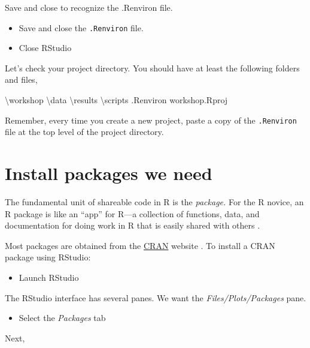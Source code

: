 \documentclass[
]{book}
\newenvironment{Shaded}{\begin{snugshade}}{\end{snugshade}}
\newcommand{\NormalTok}[1]{#1}
\providecommand{\tightlist}{%
  \setlength{\itemsep}{0pt}\setlength{\parskip}{0pt}}
\begin{document}
Save and close to recognize the .Renviron file.

\begin{itemize}
\tightlist
\item
  Save and close the \texttt{.Renviron} file.
\item
  Close RStudio
\end{itemize}

Let's check your project directory. You should have at least the
following folders and files,

\begin{Shaded}
\begin{Highlighting}[]
\NormalTok{\textbackslash{}workshop}
\NormalTok{    \textbackslash{}data}
\NormalTok{    \textbackslash{}results}
\NormalTok{    \textbackslash{}scripts}
\NormalTok{    .Renviron}
\NormalTok{    workshop.Rproj}
\end{Highlighting}
\end{Shaded}

Remember, every time you create a new project, paste a copy of the \texttt{.Renviron} file at the top level of the project directory.

\hypertarget{install-packages-we-need}{%
\section{Install packages we need}\label{install-packages-we-need}}

The fundamental unit of shareable code in R is the \emph{package.} For the R novice, an R package is like an ``app'' for R---a collection of functions, data, and documentation for doing work in R that is easily shared with others \citep{wickham2014advanced}.

Most packages are obtained from the \href{https://cran.r-project.org/}{CRAN} website \citep{cranweb}. To install a CRAN package using RStudio:

\begin{itemize}
\tightlist
\item
  Launch RStudio
\end{itemize}

The RStudio interface has several panes. We want the \emph{Files/Plots/Packages} pane.

\begin{itemize}
\tightlist
\item
  Select the \emph{Packages} tab
\end{itemize}

Next,
\end{document}
